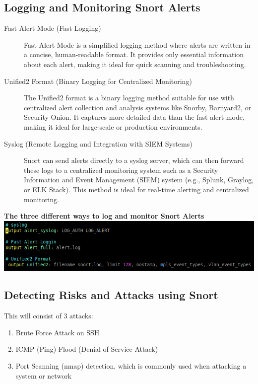 \documentclass[12pt,a4paper]{report}
\begin{document}
\newpage





\subsection{Logging and Monitoring Snort Alerts}

\begin{description}
   \item[Fast Alert Mode (Fast Logging)] Fast Alert Mode is a simplified logging method where alerts are written in a concise, human-readable format. It provides only essential information about each alert, making it ideal for quick scanning and troubleshooting.
   
	\item[Unified2 Format (Binary Logging for Centralized Monitoring)] The Unified2 format is a binary logging method suitable for use with centralized alert collection and analysis systems like Snorby, Barnyard2, or Security Onion. It captures more detailed data than the fast alert mode, making it ideal for large-scale or production environments.
      
	\item[Syslog (Remote Logging and Integration with SIEM Systems)] Snort can send alerts directly to a syslog server, which can then forward these logs to a centralized monitoring system such as a Security Information and Event Management (SIEM) system (e.g., Splunk, Graylog, or ELK Stack). This method is ideal for real-time alerting and centralized monitoring.
	
\end{description}

\textbf{The three different ways to log and monitor Snort Alerts}\\
\includegraphics[scale=0.6]{loging stuff.png} 

\subsection{Detecting Risks and Attacks using Snort}

This will consist of 3 attacks:
\begin{enumerate}
  \item Brute Force Attack on SSH
  \item ICMP (Ping) Flood (Denial of Service Attack)
  \item Port Scanning (nmap) detection, which is commonly used when attacking a system or network
\end{enumerate}
\end{document}
